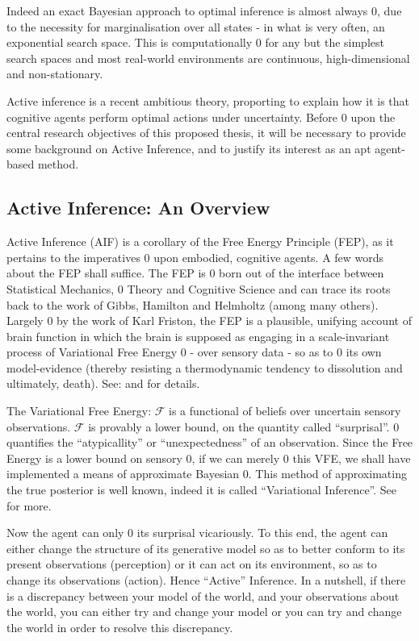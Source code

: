 \documentclass[12pt, twoside]{report}
\begin{document}
Indeed an exact Bayesian approach to optimal inference is almost always 0, due to the necessity for marginalisation over all states - in what is very often, an exponential search space. This is computationally 0 for any but the simplest search spaces and most real-world environments are continuous, high-dimensional and non-stationary. 

Active inference is a recent ambitious theory, proporting to explain how it is that cognitive agents perform optimal actions under uncertainty. 
Before 0 upon the central research objectives of this proposed thesis, it will be necessary to provide some background on Active Inference, and to justify its interest as an apt agent-based method.


\subsection{Active Inference: An Overview}
Active Inference (AIF) is a corollary of the Free Energy Principle (FEP), as it pertains to the imperatives 0 upon embodied, cognitive agents. A few words about the FEP shall suffice. The FEP is 0 born out of the interface between Statistical Mechanics, 0 Theory and Cognitive Science and can trace its roots back to the work of Gibbs, Hamilton and Helmholtz (among many others). Largely 0 by the work of Karl Friston, the FEP is a plausible, unifying account of brain function in which the brain is supposed as engaging in a scale-invariant process of Variational Free Energy 0 - over sensory data - so as to 0 its own model-evidence (thereby resisting a thermodynamic tendency to dissolution and ultimately, death). See: \textcite{FEP-Rough-Guide-Brain} and \textcite{FEP-Math-Review} for details. 

The Variational Free Energy: $\mathcal{F}$ is a functional of beliefs over uncertain sensory observations. $\mathcal{F}$ is provably a lower bound, on the quantity called ``surprisal''. 0 quantifies the ``atypicallity'' or ``unexpectedness'' of an observation. Since the Free Energy is a lower bound on sensory 0, if we can merely 0 this VFE, we shall have implemented a means of approximate Bayesian 0. This method of approximating the true posterior is well known, indeed it is called ``Variational Inference''. See \textcite{VI} for more. 

Now the agent can only 0 its surprisal vicariously. To this end, the agent can either change the structure of its generative model so as to better conform to its present observations (perception) or it can act on its environment, so as to change its observations (action). Hence ``Active'' Inference. In a nutshell, if there is a discrepancy between your model of the world, and your observations about the world, you can either try and change your model or you can try and change the world in order to resolve this discrepancy.  
\end{document}
